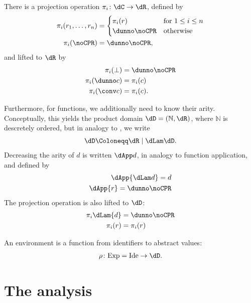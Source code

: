 \documentclass[parskip=half]{scrartcl}
\newcommand{\sIde}{\text{Ide}}
\newcommand{\sExp}{\text{Exp}}
\begin{document}
There is a projection operation $\pi_i \colon \dC \to \dR$, defined by
\begin{align*}
\pi_i(r_1,\ldots,r_n) &=
\begin{cases}
\pi_i (r) & \text{for $1 \le i \le n$}\\
\dunno\noCPR & \text{otherwise}
\end{cases}\\
\pi_i(\noCPR) &= \dunno\noCPR,
\end{align*}
and lifted to $\dR$ by
\begin{align*}
\pi_i(\bot) &= \dunno\noCPR\\
\pi_i(\dunno c) &= \pi_i(c) \\
\pi_i(\conv c) &= \pi_i(c).
\end{align*}

Furthermore, for functions, we additionally need to know their arity. Conceptually, this yields the product domain $\dD=(\mathbb N, \dR)$, where $\mathbb N$ is descretely ordered, but in analogy to \citep{cpr}, we write
\begin{align*}
\dD \Coloneqq \dR \mid \dLam\dD.
\end{align*}
Decreasing the arity of $d$ is written $\dApp d$, in analogy to function application, and defined by
\begin{align*}
\dApp{\dLam d} = d\\
\dApp{r} = \dunno\noCPR
\end{align*}
The projection operation is also lifted to $\dD$:
\begin{align*}
\pi_i\dLam{d} &= \dunno\noCPR\\
\pi_i(r) &= \pi_i(r) \\
\end{align*}


An environment is a function from identifiers to abstract values:
\begin{align*}
\rho \colon \sExp = \sIde \to \dD.
\end{align*}

\section{The analysis}
\end{document}
